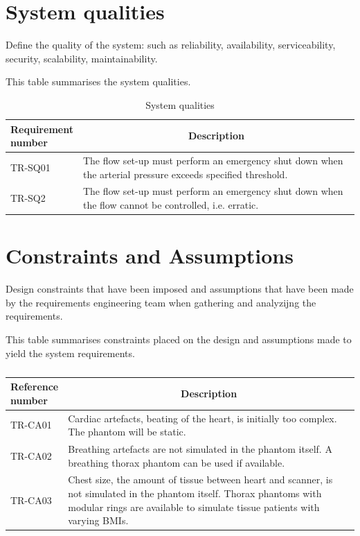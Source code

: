 \section{System qualities}
Define the quality of the system: such as reliability, availability, serviceability, security, scalability, maintainability.
\begin{table} [H]
\caption{System qualities}
\label{tab:sysqual}
This table summarises the system qualities.
\begin{tabular}{l|p{120mm}|}
	\makecell[l]{\textbf{Requirement} \\ \textbf{number}} & \multicolumn{1}{c}{\textbf{Description}}\\
	\hline
	TR-SQ01 & The flow set-up must perform an emergency shut down when the arterial pressure exceeds specified threshold. \\ 
	TR-SQ2 & The flow set-up must perform an emergency shut down when the flow cannot be controlled, i.e. erratic. \\
	\cline{2-2}
\end{tabular}
\end{table}

\section{Constraints and Assumptions}
Design constraints that have been imposed and assumptions that have been made by the requirements engineering team when gathering and analyzijng the requirements.

\begin{table}[H]
\caption{}
\label{tab:constassump}
This table summarises constraints placed on the design and assumptions made to yield the system requirements.
\begin{tabular}{l|p{120mm}|}
	\makecell[l]{\textbf{Reference} \\ \textbf{number}} & \multicolumn{1}{c}{\textbf{Description}}\\
	\hline
	TR-CA01 &  Cardiac artefacts, beating of the heart, is initially too complex. The phantom will be static. \\
	TR-CA02 & Breathing artefacts are not simulated in the phantom itself. A breathing thorax phantom can be used if available. \\
	TR-CA03 & Chest size, the amount of tissue between heart and scanner, is not simulated in the phantom itself. Thorax phantoms with modular rings are available to simulate tissue patients with varying BMIs. \\
	\cline{2-2}
\end{tabular}
\end{table}
